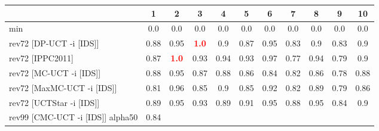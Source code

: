 \documentclass{article}
\begin{document}
\begin{tabular}{|l|r@{$\pm$}rr@{$\pm$}rr@{$\pm$}rr@{$\pm$}rr@{$\pm$}rr@{$\pm$}rr@{$\pm$}rr@{$\pm$}rr@{$\pm$}rr@{$\pm$}r|}
\hline

& \multicolumn{2}{c}{1}
& \multicolumn{2}{c}{2}
& \multicolumn{2}{c}{3}
& \multicolumn{2}{c}{4}
& \multicolumn{2}{c}{5}
& \multicolumn{2}{c}{6}
& \multicolumn{2}{c}{7}
& \multicolumn{2}{c}{8}
& \multicolumn{2}{c}{9}
& \multicolumn{2}{c|}{10}
\\
\hline
\hline
min
& \multicolumn{2}{c}{0.0}
& \multicolumn{2}{c}{0.0}
& \multicolumn{2}{c}{0.0}
& \multicolumn{2}{c}{0.0}
& \multicolumn{2}{c}{0.0}
& \multicolumn{2}{c}{0.0}
& \multicolumn{2}{c}{0.0}
& \multicolumn{2}{c}{0.0}
& \multicolumn{2}{c}{0.0}
& \multicolumn{2}{c|}{0.0}
\\
rev72 [DP-UCT -i [IDS]]
& \multicolumn{2}{c}{0.88}
& \multicolumn{2}{c}{0.95}
& \multicolumn{2}{c}{\textbf{\textcolor{red}{1.0}}}
& \multicolumn{2}{c}{0.9}
& \multicolumn{2}{c}{0.87}
& \multicolumn{2}{c}{0.95}
& \multicolumn{2}{c}{0.83}
& \multicolumn{2}{c}{0.9}
& \multicolumn{2}{c}{0.83}
& \multicolumn{2}{c|}{0.9}
\\
rev72 [IPPC2011]
& \multicolumn{2}{c}{0.87}
& \multicolumn{2}{c}{\textbf{\textcolor{red}{1.0}}}
& \multicolumn{2}{c}{0.93}
& \multicolumn{2}{c}{0.94}
& \multicolumn{2}{c}{0.93}
& \multicolumn{2}{c}{0.97}
& \multicolumn{2}{c}{0.77}
& \multicolumn{2}{c}{0.94}
& \multicolumn{2}{c}{0.79}
& \multicolumn{2}{c|}{0.9}
\\
rev72 [MC-UCT -i [IDS]]
& \multicolumn{2}{c}{0.88}
& \multicolumn{2}{c}{0.95}
& \multicolumn{2}{c}{0.87}
& \multicolumn{2}{c}{0.88}
& \multicolumn{2}{c}{0.86}
& \multicolumn{2}{c}{0.84}
& \multicolumn{2}{c}{0.82}
& \multicolumn{2}{c}{0.86}
& \multicolumn{2}{c}{0.78}
& \multicolumn{2}{c|}{0.88}
\\
rev72 [MaxMC-UCT -i [IDS]]
& \multicolumn{2}{c}{0.81}
& \multicolumn{2}{c}{0.96}
& \multicolumn{2}{c}{0.85}
& \multicolumn{2}{c}{0.9}
& \multicolumn{2}{c}{0.85}
& \multicolumn{2}{c}{0.92}
& \multicolumn{2}{c}{0.82}
& \multicolumn{2}{c}{0.89}
& \multicolumn{2}{c}{0.79}
& \multicolumn{2}{c|}{0.86}
\\
rev72 [UCTStar -i [IDS]]
& \multicolumn{2}{c}{0.89}
& \multicolumn{2}{c}{0.95}
& \multicolumn{2}{c}{0.93}
& \multicolumn{2}{c}{0.89}
& \multicolumn{2}{c}{0.91}
& \multicolumn{2}{c}{0.95}
& \multicolumn{2}{c}{0.88}
& \multicolumn{2}{c}{0.95}
& \multicolumn{2}{c}{0.84}
& \multicolumn{2}{c|}{0.9}
\\
\hline
rev99 [CMC-UCT -i [IDS]] alpha50
& \multicolumn{2}{c}{0.84}

\end{tabular}
\end{document}
